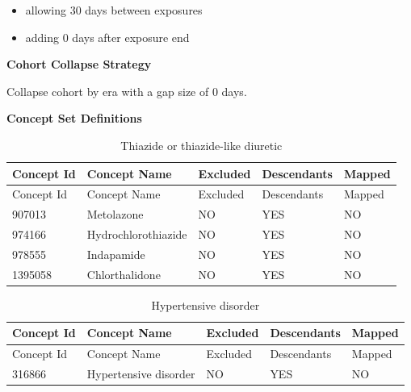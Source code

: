 \documentclass[11pt]{book}
\providecommand{\tightlist}{%
  \setlength{\itemsep}{0pt}\setlength{\parskip}{0pt}}
\theoremstyle{definition}
\theoremstyle{definition}
\theoremstyle{definition}
\theoremstyle{remark}
\begin{document}
\begin{itemize}
\tightlist
\item
  allowing 30 days between exposures
\item
  adding 0 days after exposure end
\end{itemize}

\textbf{Cohort Collapse Strategy}

Collapse cohort by era with a gap size of 0 days.

\textbf{Concept Set Definitions}

\begin{longtable}[]{@{}lllll@{}}
\caption{\label{tab:thiazidesMono} Thiazide or thiazide-like diuretic}\tabularnewline
\toprule
Concept Id & Concept Name & Excluded & Descendants & Mapped\tabularnewline
\midrule
\endfirsthead
\toprule
Concept Id & Concept Name & Excluded & Descendants & Mapped\tabularnewline
\midrule
\endhead
907013 & Metolazone & NO & YES & NO\tabularnewline
974166 & Hydrochlorothiazide & NO & YES & NO\tabularnewline
978555 & Indapamide & NO & YES & NO\tabularnewline
1395058 & Chlorthalidone & NO & YES & NO\tabularnewline
\bottomrule
\end{longtable}

\begin{longtable}[]{@{}lllll@{}}
\caption{\label{tab:hypertensionThzMono} Hypertensive disorder}\tabularnewline
\toprule
Concept Id & Concept Name & Excluded & Descendants & Mapped\tabularnewline
\midrule
\endfirsthead
\toprule
Concept Id & Concept Name & Excluded & Descendants & Mapped\tabularnewline
\midrule
\endhead
316866 & Hypertensive disorder & NO & YES & NO\tabularnewline
\bottomrule
\end{longtable}
\end{document}
